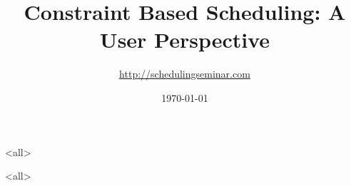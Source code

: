 \title[Constraint Based Scheduling] %
{Constraint Based Scheduling: A User Perspective}

\subtitle
{\url{http://schedulingseminar.com}} %
\date{\today}


\mode<all>{

}
\mode<all>{

}


